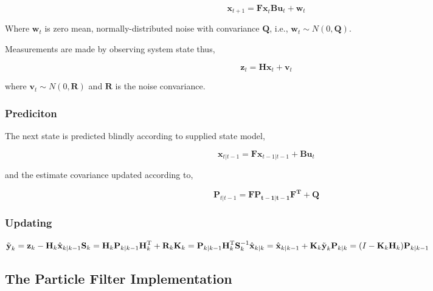 \begin{equation}
\mathbf{x}_{t+1} = \mathbf{Fx}_{t} \mathbf{Bu}_{t} + \mathbf{w}_t
\end{equation}

Where $\mathbf{w}_t$ is zero mean, normally-distributed noise with convariance
$\mathbf{Q}$, i.e., $\mathbf{w}_{t} \sim N(0, \mathbf{Q})$.

Measurements are made by observing system state thus,

\begin{equation}
\mathbf{z}_{t} = \mathbf{Hx}_{t} + \mathbf{v}_t
\end{equation}

where $\mathbf{v}_{t} \sim N(0, \mathbf{R})$ and $\mathbf{R}$ is the
noise convariance.

\subsubsection{Prediciton}
The next state is predicted blindly according to supplied state model,

\begin{equation}
\mathbf{x}_{t|t-1} = \mathbf{Fx}_{t-1|t-1} + \mathbf{Bu}_{t}
\end{equation}

and the estimate covariance updated according to,

\begin{equation}
\mathbf{P}_{t|t-1} = \mathbf{FP_{t-1|t-1}F^{T}} + \mathbf{Q}
\end{equation}

\subsubsection{Updating}

\begin{math}
\tilde{\textbf{y}}_k = \textbf{z}_k - \textbf{H}_k\hat{\textbf{x}}_{k|k-1}\\
\textbf{S}_k = \textbf{H}_k \textbf{P}_{k|k-1} \textbf{H}_k^\text{T} + \textbf{R}_k\\
\textbf{K}_k = \textbf{P}_{k|k-1}\textbf{H}_k^\text{T}\textbf{S}_k^{-1}\\
\hat{\textbf{x}}_{k|k} = \hat{\textbf{x}}_{k|k-1} + \textbf{K}_k\tilde{\textbf{y}}_k\\
\textbf{P}_{k|k} = (I - \textbf{K}_k \textbf{H}_k) \textbf{P}_{k|k-1}
\end{math}

\subsection{The Particle Filter Implementation}

    